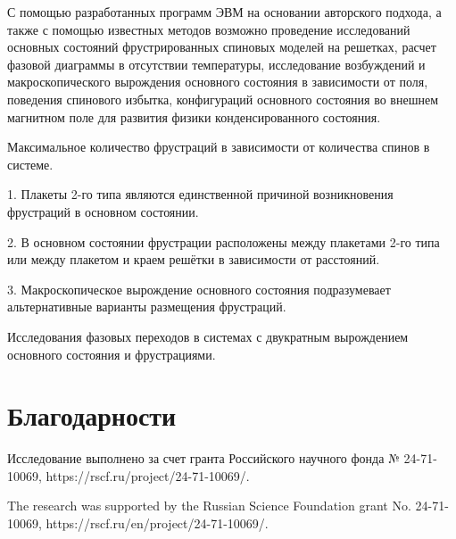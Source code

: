 \documentclass[utf8, babel, sor, jor, amsmath, amssymb, reprint]{elsarticle} %
\begin{document}
С помощью разработанных программ ЭВМ на основании авторского подхода, а также с помощью известных методов возможно проведение исследований основных состояний фрустрированных спиновых моделей на решетках, расчет фазовой диаграммы в отсутствии температуры, исследование возбуждений и макроскопического вырождения основного состояния в зависимости от поля, поведения спинового избытка, конфигураций основного состояния во внешнем магнитном поле для развития физики конденсированного состояния.

Максимальное количество фрустраций в зависимости от количества спинов в системе.

1. Плакеты 2-го типа являются единственной причиной возникновения фрустраций в основном состоянии.

2. В основном состоянии фрустрации расположены между плакетами 2-го типа или между плакетом и краем решётки в зависимости от расстояний.

3. Макроскопическое вырождение основного состояния подразумевает альтернативные варианты размещения фрустраций.


Исследования фазовых переходов в системах с двукратным вырождением основного состояния и фрустрациями.

\section{Благодарности}

Исследование выполнено за счет гранта Российского научного фонда № 24-71-10069, https://rscf.ru/project/24-71-10069/.

The research was supported by the Russian Science Foundation grant No. 24-71-10069, https://rscf.ru/en/project/24-71-10069/.


\end{document}
